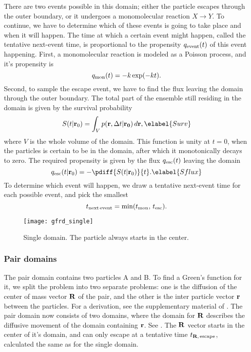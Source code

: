 There are two events possible in this domain; either the particle escapes through the outer boundary, or it undergoes a monomolecular reaction $X\rightarrow Y$. To continue, we have to determine which of these events is going to take place and when it will happen. The time at which a certain event might happen, called the tentative next-event time, is proportional to the propensity $q_{\rm event}(t)$ of this event happening. First, a monomolecular reaction is modeled as a Poisson process, and it's propensity is
\begin{equation}
 q_{\rm mon}(t) = -k\, {\rm exp}(-k t).
\end{equation}
Second, to sample the escape event, we have to find the flux leaving the domain through the outer boundary. The total part of the ensemble still residing in the domain is given by the survival probability
\begin{equation}
 S(t|{\mathbf r_0}) = \int_V p({\bf r}, \Delta t|{\bf r_0}) \, d{\mathbf r},
 \elabel{Surv}
\end{equation}
where $V$ is the whole volume of the domain. This function is unity at $t=0$, when the particles is certain to be in the domain, after which it monotonically decays to zero. The required propensity is given by the flux $q_{\rm esc}(t)$ leaving the domain
\begin{equation}
 q_{\rm esc}(t|{\mathbf r_0}) = -\pdiff{S(t|{\mathbf r_0})}{t}.
 \elabel{Sflux}
\end{equation}
To determine which event will happen, we draw a tentative next-event time for each possible event, and pick the smallest
\begin{equation}
 t_{\rm next\,event} = {\rm min}(t_{\rm mon},\,t_{\rm esc}).
\end{equation}

\begin{figure}[ht]
\centering
\texttt{[image: gfrd\_single]}
\caption{ Single domain. The particle always starts in the center.}
\end{figure}


\subsubsection{Pair domains}
The pair domain contains two particles A and B. To find a Green's function for it, we split the problem into two separate problems: one is the diffusion of the center of mass vector ${\bf R}$ of the pair, and the other is the inter particle vector ${\bf r}$ between the particles. For a derivation, see the supplementary material of \cite{Takahashi2010}. The pair domain now consists of two domains, where the domain for ${\bf R}$ describes the diffusive movement of the domain containing ${\bf r}$. See . The ${\bf R}$ vector starts in the center of it's domain, and can only escape at a tentative time $t_{{\bf R},\,{\rm escape}}$, calculated the same as for the single domain. 

